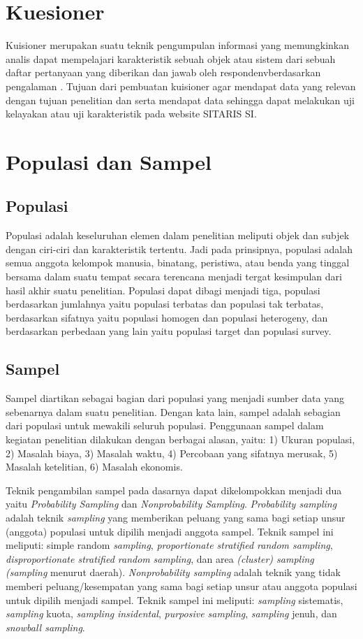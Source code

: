 \section{Kuesioner}
Kuisioner merupakan suatu teknik pengumpulan informasi yang memungkinkan analis dapat mempelajari karakteristik sebuah objek atau sistem dari sebuah daftar pertanyaan yang diberikan dan jawab oleh respondenvberdasarkan pengalaman \cite{amalia2022pengaruh}. Tujuan dari pembuatan kuisioner agar mendapat data yang relevan dengan tujuan penelitian dan serta mendapat data sehingga dapat melakukan uji kelayakan atau uji karakteristik pada website SITARIS SI.

\section{Populasi dan Sampel}
\subsection{Populasi}
Populasi adalah keseluruhan elemen dalam penelitian meliputi objek dan subjek dengan ciri-ciri dan karakteristik tertentu. Jadi pada prinsipnya, populasi adalah semua anggota kelompok manusia, binatang, peristiwa, atau benda yang tinggal bersama dalam suatu tempat secara terencana menjadi tergat kesimpulan dari hasil akhir suatu penelitian. Populasi dapat dibagi menjadi tiga, populasi berdasarkan jumlahnya yaitu populasi terbatas dan populasi tak terbatas, berdasarkan sifatnya yaitu populasi homogen dan populasi heterogeny, dan berdasarkan perbedaan yang lain yaitu populasi target dan populasi survey. \cite{amin2023konsep}

\subsection{Sampel}

Sampel diartikan sebagai bagian dari populasi yang menjadi sumber data yang sebenarnya dalam suatu penelitian. Dengan kata lain, sampel adalah sebagian dari populasi untuk mewakili seluruh populasi. Penggunaan sampel dalam kegiatan penelitian dilakukan dengan berbagai alasan, yaitu: 1) Ukuran populasi, 2) Masalah biaya, 3) Masalah waktu, 4) Percobaan yang sifatnya merusak, 5) Masalah ketelitian, 6) Masalah ekonomis.

Teknik pengambilan sampel pada dasarnya dapat dikelompokkan menjadi dua yaitu \textit{Probability Sampling} dan \textit{Nonprobability Sampling}.\textit{ Probability sampling } adalah teknik \textit{sampling} yang memberikan peluang yang sama bagi setiap unsur (anggota) populasi untuk dipilih menjadi anggota sampel. Teknik sampel ini meliputi: simple random \textit{sampling}, \textit{proportionate stratified random sampling}, \textit{disproportionate stratified random} \textit{sampling}, dan area \textit{(cluster) sampling (sampling} menurut daerah). \textit{Nonprobability sampling} adalah teknik yang tidak memberi peluang/kesempatan yang sama bagi setiap unsur atau anggota populasi untuk dipilih menjadi sampel. Teknik sampel ini meliputi: \textit{sampling} sistematis, \textit{sampling} kuota, \textit{sampling} \textit{insidental}, \textit{purposive sampling}, \textit{sampling} jenuh, dan \textit{snowball sampling}.

